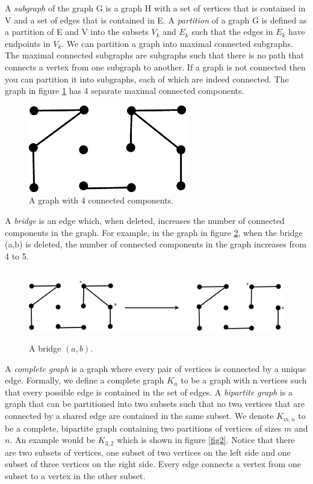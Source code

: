 A \emph{subgraph} of the graph G is a graph H with a set of vertices that is contained in V and a set of edges that is contained in E.  A \emph{partition} of a graph G is defined as a partition of E and V into the subsets $V_k$ and $E_k$ such that the edges in $E_k$ have endpoints in $V_k$. We can partition a graph into maximal connected subgraphs. The maximal connected subgraphs are subgraphs such that there is no path that connects a vertex from one subgraph to another. If a graph is not connected then you can partition it into subgraphs, each of which are indeed connected. The graph in figure \ref{4comp} has 4 separate maximal connected components.
	
\begin{figure}
	\centering
\includegraphics[height=1.5in]{4comp.eps}
\caption{A graph with 4 connected components.}
\label{4comp}
\end{figure}

A \emph{bridge} is an edge which, when deleted, increases the number of connected components in the graph. For example, in the graph in figure \ref{bridge}, when the bridge (a,b) is deleted, the number of connected components in the graph increases from 4 to 5.

\begin{figure}
	\centering
\includegraphics[height=1.2in]{bridge.eps}
\caption{A bridge $(a,b)$.}
\label{bridge}
\end{figure}

A \emph{complete graph} is a graph where every pair of vertices is connected by a unique edge. Formally, we define a complete graph $K_n$ to be a graph with n vertices such that every possible edge is contained in the set of edges. 	
A \emph{bipartite graph} is a graph that can be partitioned into two subsets such that no two vertices that are connected by a shared edge are contained in the same subset. We denote $K_{m,n}$ to be a complete, bipartite graph containing two partitions of vertices of sizes $m$ and $n$. An example would be $K_{3,2}$ which is shown in figure \ref{fig2}.  Notice that there are two subsets of vertices, one subset of two vertices on the left side and one subset of three vertices on the right side. Every edge connects a vertex from one subset to  a vertex in the other subset.

